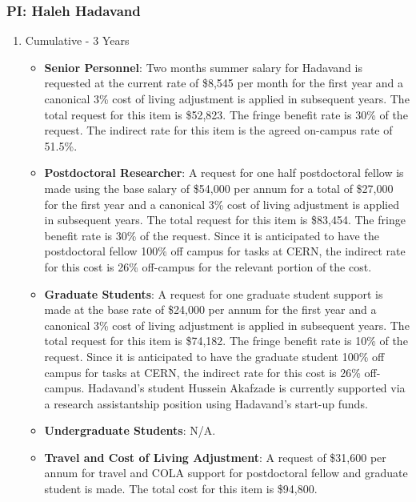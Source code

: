 \newpage
\subsubsection{\bf PI: Haleh Hadavand}

\begin{enumerate}
\item{Cumulative - 3 Years}

\begin{itemize}
\item{{\bf Senior Personnel}: Two months summer salary for Hadavand is requested at the current rate of \$8,545 per month for the first year and a canonical 3\% cost of living adjustment is applied in subsequent years. The total request for this item is \$52,823.   The fringe benefit rate is 30\% of the request.  The indirect rate for this item is the agreed on-campus rate of 51.5\%.}

\item {{\bf Postdoctoral Researcher}: A request for one half postdoctoral fellow is made using the base salary of \$54,000 per annum for a total of \$27,000 for the first year and a canonical 3\% cost of living adjustment is applied in subsequent years.  The total request for this item is \$83,454. The fringe benefit rate is 30\% of the request.  Since it is anticipated to have the postdoctoral fellow 100\% off campus for tasks at CERN, the indirect rate for this cost is 26\% off-campus for the relevant portion of the cost.} 

\item{{\bf Graduate Students}: A request for one graduate student support is made at the base rate of \$24,000 per annum for the first year and a canonical 3\% cost of living adjustment is applied in subsequent years. The total request for this item is \$74,182.   The fringe benefit rate is 10\% of the request.  Since it is anticipated to have the graduate student 100\% off campus for tasks at CERN, the indirect rate for this cost is 26\% off-campus.  Hadavand's student Hussein Akafzade is currently supported via a research assistantship position using Hadavand's start-up funds. }

\item {{\bf Undergraduate Students}: N/A.}

\item{{\bf Travel and Cost of Living Adjustment}: A request of \$31,600 per annum for travel and COLA support for postdoctoral fellow and graduate student is made.   The total cost for this item is \$94,800.}


\end{itemize}
\end{enumerate}
